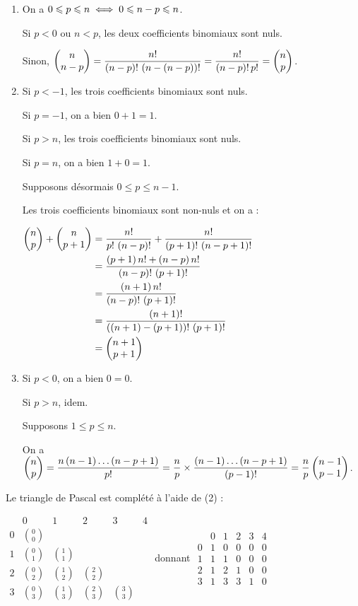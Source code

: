 \begin{dem}
\begin{enumerate}
\item On a \(0\leq p\leq n\ssi0\leq n-p\leq n\).

Si \(p<0\) ou \(n<p\), les deux coefficients binomiaux sont nuls.

Sinon, \(\binom{n-p}{n}=\dfrac{n!}{\paren{n-p}!\,\paren{n-\paren{n-p}}!}=\dfrac{n!}{\paren{n-p}!\,p!}=\binom{p}{n}\).

\item Si \(p<-1\), les trois coefficients binomiaux sont nuls.

Si \(p=-1\), on a bien \(0+1=1\).

Si \(p>n\), les trois coefficients binomiaux sont nuls.

Si \(p=n\), on a bien \(1+0=1\).

Supposons désormais \(0\leq p\leq n-1\).

Les trois coefficients binomiaux sont non-nuls et on a :

\(\begin{aligned}[t]
\binom{p}{n}+\binom{p+1}{n}&=\dfrac{n!}{p!\,\paren{n-p}!}+\dfrac{n!}{\paren{p+1}!\,\paren{n-p+1}!} \\
&=\dfrac{\paren{p+1}n!+\paren{n-p}n!}{\paren{n-p}!\,\paren{p+1}!} \\
&=\dfrac{\paren{n+1}n!}{\paren{n-p}!\,\paren{p+1}!} \\
&=\dfrac{\paren{n+1}!}{\paren{\paren{n+1}-\paren{p+1}}!\,\paren{p+1}!} \\
&=\binom{p+1}{n+1}
\end{aligned}\)

\item Si \(p<0\), on a bien \(0=0\).

Si \(p>n\), idem.

Supposons \(1\leq p\leq n\).

On a \(\binom{p}{n}=\dfrac{n\paren{n-1}\dots\paren{n-p+1}}{p!}=\dfrac{n}{p}\times\dfrac{\paren{n-1}\dots\paren{n-p+1}}{\paren{p-1}!}=\dfrac{n}{p}\binom{p-1}{n-1}\).
\end{enumerate}
\end{dem}

\begin{rem}
Le triangle de Pascal est complété à l'aide de (2) :

\(\begin{array}{c|ccccc}
&0&1&2&3&4 \\
\hline
0&\binom{0}{0}&&&& \\[1em]
1&\binom{0}{1}&\binom{1}{1}&&& \\[1em]
2&\binom{0}{2}&\binom{1}{2}&\binom{2}{2}&& \\[1em]
3&\binom{0}{3}&\binom{1}{3}&\binom{2}{3}&\binom{3}{3}&
\end{array}\) donnant \(\begin{array}{c|ccccc}
&0&1&2&3&4 \\
\hline
0&1&0&0&0&0 \\
1&1&1&0&0&0 \\
2&1&2&1&0&0 \\
3&1&3&3&1&0
\end{array}\)
\end{rem}


